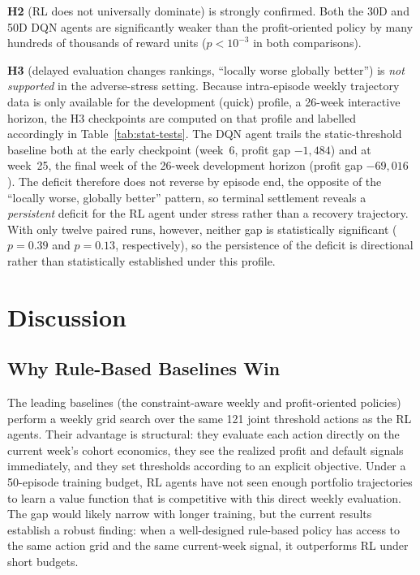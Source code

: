 \documentclass[preprint,review,authoryear,12pt]{elsarticle}
\begin{document}
\textbf{H2} (RL does not universally dominate) is strongly confirmed. Both the 30D and
50D DQN agents are significantly weaker than the profit-oriented policy by many hundreds
of thousands of reward units ($p<10^{-3}$ in both comparisons).

\textbf{H3} (delayed evaluation changes rankings, ``locally worse globally better'') is
\emph{not supported} in the adverse-stress setting. Because intra-episode weekly
trajectory data is only available for the development (quick) profile, a 26-week
interactive horizon, the H3 checkpoints are computed on that profile and labelled
accordingly in Table~\ref{tab:stat-tests}. The DQN agent trails the static-threshold
baseline both at the early checkpoint (week~6, profit gap $-1{,}484$) and at week~25, the
final week of the 26-week development horizon (profit gap $-69{,}016$). The deficit
therefore does not reverse by episode end, the opposite of the ``locally worse, globally
better'' pattern, so terminal settlement reveals a \emph{persistent} deficit for the RL
agent under stress rather than a recovery trajectory. With only twelve paired runs,
however, neither gap is statistically significant ($p = 0.39$ and $p = 0.13$,
respectively), so the persistence of the deficit is directional rather than statistically
established under this profile.

\section{Discussion}

\subsection{Why Rule-Based Baselines Win}

The leading baselines (the constraint-aware weekly and profit-oriented policies) perform
a weekly grid search over the same 121 joint threshold actions as the RL agents. Their
advantage is structural: they evaluate each action directly on the current week's cohort
economics, they see the realized profit and default signals immediately, and they set
thresholds according to an explicit objective. Under a 50-episode training budget, RL
agents have not seen enough portfolio trajectories to learn a value function that is
competitive with this direct weekly evaluation. The gap would likely narrow with longer
training, but the current results establish a robust finding: when a well-designed
rule-based policy has access to the same action grid and the same current-week signal,
it outperforms RL under short budgets.
\end{document}

